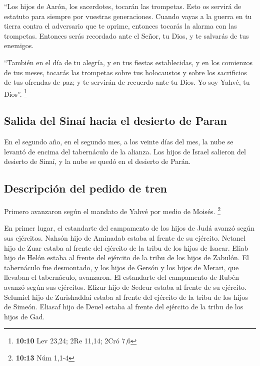 \begin{paracol}{2}
 ``Los hijos de Aarón, los sacerdotes, tocarán las
trompetas. Esto os servirá de estatuto para siempre por vuestras
generaciones.  Cuando vayas a la guerra en tu tierra
contra el adversario que te oprime, entonces tocarás la alarma con las
trompetas. Entonces serás recordado ante el Señor, tu Dios, y te
salvarás de tus enemigos.

 ``También en el día de tu alegría, y en tus fiestas
establecidas, y en los comienzos de tus meses, tocarás las trompetas
sobre tus holocaustos y sobre los sacrificios de tus ofrendas de paz; y
te servirán de recuerdo ante tu Dios. Yo soy Yahvé, tu Dios''.
\footnote{\textbf{10:10} Lev 23,24; 2Re 11,14; 2Cró 7,6}

\hypertarget{salida-del-sinauxed-hacia-el-desierto-de-paran}{%
\subsection{Salida del Sinaí hacia el desierto de
Paran}\label{salida-del-sinauxed-hacia-el-desierto-de-paran}}

 En el segundo año, en el segundo mes, a los veinte días
del mes, la nube se levantó de encima del tabernáculo de la alianza.
 Los hijos de Israel salieron del desierto de Sinaí, y la
nube se quedó en el desierto de Parán.

\hypertarget{descripciuxf3n-del-pedido-de-tren}{%
\subsection{Descripción del pedido de
tren}\label{descripciuxf3n-del-pedido-de-tren}}

 Primero avanzaron según el mandato de Yahvé por medio de
Moisés. \footnote{\textbf{10:13} Núm 1,1-4}

 En primer lugar, el estandarte del campamento de los
hijos de Judá avanzó según sus ejércitos. Nahsón hijo de Aminadab estaba
al frente de su ejército.  Netanel hijo de Zuar estaba al
frente del ejército de la tribu de los hijos de Isacar. 
Eliab hijo de Helón estaba al frente del ejército de la tribu de los
hijos de Zabulón.  El tabernáculo fue desmontado, y los
hijos de Gersón y los hijos de Merari, que llevaban el tabernáculo,
avanzaron.  El estandarte del campamento de Rubén avanzó
según sus ejércitos. Elizur hijo de Sedeur estaba al frente de su
ejército.  Selumiel hijo de Zurishaddai estaba al frente
del ejército de la tribu de los hijos de Simeón.  Eliasaf
hijo de Deuel estaba al frente del ejército de la tribu de los hijos de
Gad.


\end{paracol}
